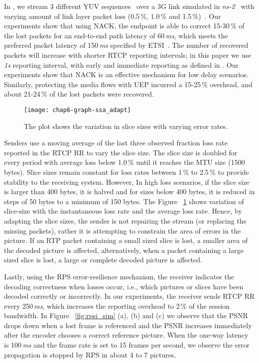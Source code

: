 In , we stream 3 different YUV sequences~\cite{YUV_seq} over a
3G link simulated in \emph{ns-2}~\cite{ns2} with varying amount of link layer
packet loss (0.5\,\%, 1.0\,\% and 1.5\,\%)~\cite{3gppSim}. Our experiments
show that using NACK, the endpoint is able to correct 15-30\,\% of the lost
packets for an end-to-end path latency of 60\,\emph{ms}, which meets the
preferred  packet latency of 150\,\emph{ms} specified by ETSI~\cite{etsi.qoe}.
The number of recovered packets will increase with shorter RTCP reporting
intervals; in this paper we use \emph{1s} reporting interval, with early and
immediate reporting as defined in \cite{rfc4585}. Our experiments show that
NACK is an effective mechanism for low delay scenarios. Similarly, protecting
the media flows with UEP incurred a 15-25\,\% overhead, and about 21-24\,\% of
the lost packets were recovered.

\begin{figure}
\centerline {
\texttt{[image: chap6-graph-ssa\_adapt]}
}
\caption{The plot shows the variation in slice sizes with varying error
rates.}
\label{fig:ssa_adapt}
\end{figure}

Senders use a moving average of the last three observed fraction loss rate
reported in the RTCP RR to vary the slice size. The slice size is doubled for
every period with average loss below 1.0\,\% until it reaches the MTU size
(1500 bytes). Slice sizes remain constant for loss rates between 1\,\% to
2.5\,\% to provide stability to the receiving system. However, In high loss
scenarios, if the slice size is larger than 400 bytes, it is halved and for
sizes below 400 bytes, it is reduced in steps of 50 bytes to a minimum of 150
bytes. The Figure ~\ref{fig:ssa_adapt} shows variation of slice-size with the
instantaneous loss rate and the average loss rate. Hence, by adapting the
slice sizes, the sender is not repairing the stream (or replacing the missing
packets), rather it is attempting to constrain the area of errors in the
picture. If an RTP packet containing a small sized slice is lost, a smaller
area of the decoded picture is affected, alternatively, when a packet
containing a large sized slice is lost, a large or complete decoded picture is
affected.

Lastly, using the RPS error-resilience mechanism, the receiver indicates the
decoding correctness when losses occur, i.e., which pictures or slices have
been decoded correctly or incorrectly.  In our experiments, the receiver sends
RTCP RR every 250\,\emph{ms}, which increases the reporting overhead to 2\,\%
of the session bandwidth. In Figure ~\ref{fig:rpsi_sim} (a), (b) and (c) we
observe that the PSNR drops down when a lost frame is referenced and the PSNR
increases immediately after the encoder chooses a correct reference picture.
When the one-way latency is 100\,\emph{ms} and the frame rate is set to 15
frames per second, we observe the error propagation is stopped by RPS in about
4 to 7 pictures.


